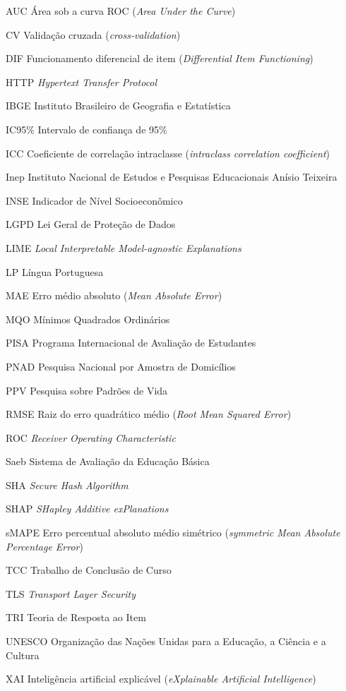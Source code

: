 \begin{siglas}
	\item[AUC] Área sob a curva ROC (\textit{Area Under the Curve})
	\item[CV] Validação cruzada (\textit{cross-validation})
	\item[DIF] Funcionamento diferencial de item (\textit{Differential Item Functioning})
	\item[HTTP] \textit{Hypertext Transfer Protocol}
	\item[IBGE] Instituto Brasileiro de Geografia e Estatística
	\item[IC95\%] Intervalo de confiança de 95\%
	\item[ICC] Coeficiente de correlação intraclasse (\textit{intraclass correlation coefficient})
	\item[Inep] Instituto Nacional de Estudos e Pesquisas Educacionais Anísio Teixeira
	\item[INSE] Indicador de Nível Socioeconômico
	\item[LGPD] Lei Geral de Proteção de Dados
	\item[LIME] \textit{Local Interpretable Model-agnostic Explanations}
	\item[LP] Língua Portuguesa
	\item[MAE] Erro médio absoluto (\textit{Mean Absolute Error})
	\item[MQO] Mínimos Quadrados Ordinários
	\item[PISA] Programa Internacional de Avaliação de Estudantes
	\item[PNAD] Pesquisa Nacional por Amostra de Domicílios
	\item[PPV] Pesquisa sobre Padrões de Vida
	\item[RMSE] Raiz do erro quadrático médio (\textit{Root Mean Squared Error})
	\item[ROC] \textit{Receiver Operating Characteristic}
	\item[Saeb] Sistema de Avaliação da Educação Básica
	\item[SHA] \textit{Secure Hash Algorithm}
	\item[SHAP] \textit{SHapley Additive exPlanations}
	\item[sMAPE] Erro percentual absoluto médio simétrico (\textit{symmetric Mean Absolute Percentage Error})
	\item[TCC] Trabalho de Conclusão de Curso
	\item[TLS] \textit{Transport Layer Security}
	\item[TRI] Teoria de Resposta ao Item
	\item[UNESCO] Organização das Nações Unidas para a Educação, a Ciência e a Cultura
	\item[XAI] Inteligência artificial explicável (\textit{eXplainable Artificial Intelligence})
\end{siglas}

\tableofcontents*
\cleardoublepage


\textual






\postextual

\printbibliography[heading=bibintoc, title={Referências}]




